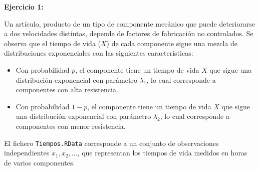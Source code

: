 \textbf{Ejercicio 1:}

Un artículo, producto de un tipo de componente mecánico que puede deteriorarse a dos velocidades distintas, depende de factores de fabricación no controlados.  
Se observa que el tiempo de vida ($X$) de cada componente sigue una mezcla de distribuciones exponenciales con las siguientes características:

\begin{itemize}
    \item Con probabilidad \(p\), el componente tiene un tiempo de vida \(X\) que sigue una distribución exponencial con parámetro \(\lambda_1\), lo cual corresponde a componentes con alta resistencia.
    \item Con probabilidad \(1-p\), el componente tiene un tiempo de vida \(X\) que sigue una distribución exponencial con parámetro \(\lambda_2\), lo cual corresponde a componentes con menor resistencia.
\end{itemize}

El fichero \texttt{Tiempos.RData} corresponde a un conjunto de observaciones independientes \(x_1, x_2, \dots \), que representan los tiempos de vida medidos en horas de varios componentes.

